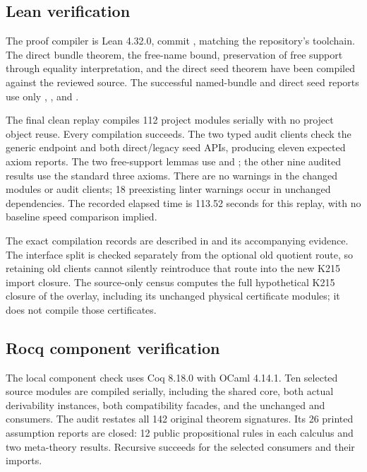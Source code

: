 \subsection{Lean verification}

The proof compiler is Lean 4.32.0, commit
, matching the repository's
toolchain. The direct bundle theorem, the free-name bound, preservation of free
support through equality interpretation, and the direct seed theorem have been
compiled against the reviewed source. The successful named-bundle and direct
seed reports use only , , and
.

The final clean replay compiles 112 project modules serially with no project
object reuse. Every compilation succeeds. The two typed audit clients check
the generic endpoint and both direct/legacy seed APIs, producing eleven
expected axiom reports. The two free-support lemmas use  and
; the other nine audited results use the standard three
axioms. There are no warnings in the changed modules or audit clients; 18
preexisting linter warnings occur in unchanged dependencies. The recorded
elapsed time is 113.52 seconds for this replay, with no baseline speed
comparison implied.

The exact compilation records are described in  and
its accompanying evidence. The interface split is
checked separately from the optional old quotient route, so retaining old
clients cannot silently reintroduce that route into the new K215 import closure.
The source-only census computes the full hypothetical K215 closure of the
overlay, including its unchanged physical certificate modules; it does not
compile those certificates.

\subsection{Rocq component verification}

The local component check uses Coq 8.18.0 with OCaml 4.14.1. Ten selected source
modules are compiled serially, including the shared core, both actual
derivability instances, both compatibility facades, and the unchanged
 and  consumers. The audit restates all
142 original theorem signatures. Its 26 printed assumption reports are closed:
12 public propositional rules in each calculus and two meta-theory results.
Recursive  succeeds for the selected consumers and their imports.

